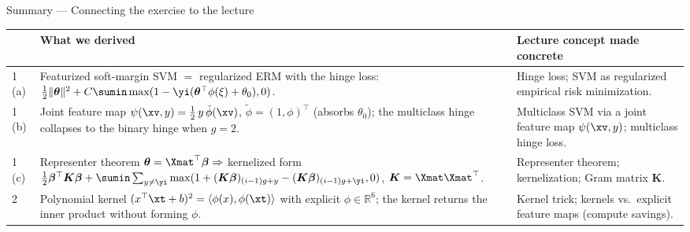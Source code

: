\documentclass[aspectratio=169]{beamer}
\newcommand{\thetab}{\bm{\theta}}
\newcommand{\betav}{\bm{\beta}}
\newcommand{\Kmat}{\bm{K}}
\renewcommand{\phixi}{\phi(\xi)}
\begin{document}
\begin{frame}{Summary --- Connecting the exercise to the lecture}
	\footnotesize
	\begin{center}
	\renewcommand{\arraystretch}{1.05}
	\begin{tabular}{@{}p{}p{}p{}@{}}
		\toprule
		& \textbf{What we derived} & \textbf{Lecture concept made concrete} \\
		\midrule
		1\,(a) &
			Featurized soft-margin SVM $=$ regularized ERM with the hinge loss: $\tfrac12\|\thetab\|^2 + C\sumin \max(1 - \yi(\thetab^\top\phixi + \theta_0), 0)$. &
			Hinge loss; SVM as regularized empirical risk minimization. \\
		1\,(b) &
			Joint feature map $\psi(\xv,y) = \tfrac12\, y\,\tilde\phi(\xv)$, $\tilde\phi = (1,\phi)^\top$ (absorbs $\theta_0$); the multiclass hinge collapses to the binary hinge when $g=2$. &
			Multiclass SVM via a joint feature map $\psi(\xv,y)$; multiclass hinge loss. \\
		1\,(c) &
			Representer theorem $\thetab = \Xmat^\top\betav \Rightarrow$ kernelized form $\tfrac12\betav^\top\Kmat\betav + \sumin\sum_{y\neq\yi}\max(1 + (\Kmat\betav)_{(i-1)g+y} - (\Kmat\betav)_{(i-1)g+\yi}, 0)$, $\Kmat = \Xmat\Xmat^\top$. &
			Representer theorem; kernelization; Gram matrix $\Kmat$. \\
		2 &
			Polynomial kernel $(x^\top\xt + b)^2 = \langle\phi(x),\phi(\xt)\rangle$ with explicit $\phi \in \mathbb{R}^6$; the kernel returns the inner product without forming $\phi$. &
			Kernel trick; kernels vs.\ explicit feature maps (compute savings). \\
		\bottomrule
	\end{tabular}
	\end{center}
\end{frame}
\end{document}
